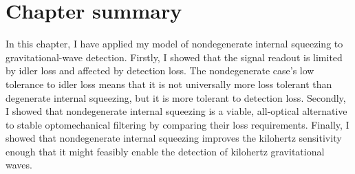 \section{Chapter summary}

In this chapter, I have applied my model of nondegenerate internal squeezing to gravitational-wave detection. %
Firstly, I showed that the signal readout is limited by idler loss and affected by detection loss. %
The nondegenerate case's low tolerance to idler loss means that it is not universally more loss tolerant than degenerate internal squeezing, but it is more tolerant to detection loss. %
Secondly, I showed that nondegenerate internal squeezing is a viable, all-optical alternative to stable optomechanical filtering by comparing their loss requirements.
Finally, I showed that nondegenerate internal squeezing improves the kilohertz sensitivity enough that it might feasibly enable the detection of kilohertz gravitational waves. %



